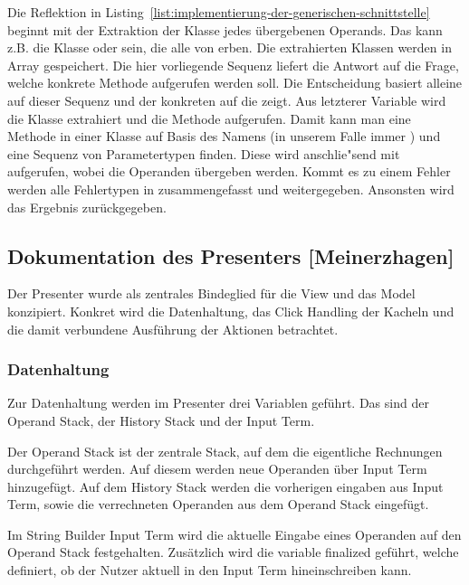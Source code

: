 Die Reflektion in Listing~\ref{list:implementierung-der-generischen-schnittstelle} beginnt mit der Extraktion der Klasse jedes übergebenen Operands. Das kann z.B. die Klasse  oder  sein, die alle von  erben. Die extrahierten Klassen werden in Array  gespeichert. Die hier vorliegende Sequenz liefert die Antwort auf die Frage, welche konkrete Methode aufgerufen werden soll. Die Entscheidung basiert alleine auf dieser Sequenz und der konkreten  auf die  zeigt. Aus letzterer Variable wird die Klasse extrahiert und die Methode  aufgerufen. Damit kann man eine Methode in einer Klasse auf Basis des Namens (in unserem Falle immer ) und eine Sequenz von Parametertypen finden. Diese wird anschlie"send mit  aufgerufen, wobei die Operanden übergeben werden. Kommt es zu einem Fehler werden alle Fehlertypen in  zusammengefasst und weitergegeben. Ansonsten wird das Ergebnis zurückgegeben.

\subsection{Dokumentation des Presenters [Meinerzhagen]}

Der Presenter wurde als zentrales Bindeglied für die View und das Model konzipiert. Konkret wird die Datenhaltung, das Click Handling der Kacheln und die damit verbundene Ausführung der Aktionen betrachtet.
	
\subsubsection{Datenhaltung}

Zur Datenhaltung werden im Presenter drei Variablen geführt. Das sind der Operand Stack, der History Stack und der Input Term.

Der Operand Stack ist der zentrale Stack, auf dem die eigentliche Rechnungen durchgeführt werden. Auf diesem werden neue Operanden über Input Term hinzugefügt.
Auf dem History Stack werden die vorherigen eingaben aus Input Term, sowie die verrechneten Operanden aus dem Operand Stack eingefügt.

Im String Builder Input Term wird die aktuelle Eingabe eines Operanden auf den Operand Stack festgehalten. Zusätzlich wird die variable finalized geführt, welche definiert, ob der Nutzer aktuell in den Input Term hineinschreiben kann.

